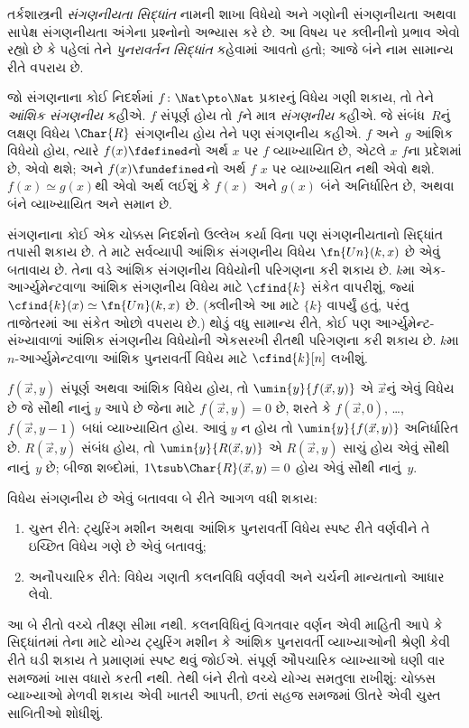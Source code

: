 તર્કશાસ્ત્રની \emph{સંગણનીયતા સિદ્ધાંત} નામની શાખા વિધેયો અને ગણોની
સંગણનીયતા અથવા સાપેક્ષ સંગણનીયતા અંગેના પ્રશ્નોનો અભ્યાસ કરે છે.
આ વિષય પર ક્લીનીનો પ્રભાવ એવો રહ્યો છે કે પહેલાં તેને \emph{પુનરાવર્તન
  સિદ્ધાંત} કહેવામાં આવતો હતો; આજે બંને નામ સામાન્ય રીતે વપરાય છે.

જો સંગણનાના કોઈ નિદર્શમાં $f\colon \Nat \pto \Nat$ પ્રકારનું વિધેય
ગણી શકાય, તો તેને \emph{આંશિક સંગણનીય} કહીએ. $f$ સંપૂર્ણ હોય તો
$f$ને માત્ર \emph{સંગણનીય} કહીએ. જે સંબંધ~$R$નું લક્ષણ વિધેય
$\Char{R}$ સંગણનીય હોય તેને પણ સંગણનીય કહીએ. $f$ અને~$g$ આંશિક
વિધેયો હોય, ત્યારે $f(x) \fdefined$નો અર્થ $x$ પર $f$ વ્યાખ્યાયિત
છે, એટલે $x$ $f$ના પ્રદેશમાં છે, એવો થશે; અને $f(x) \fundefined$નો
અર્થ $f$ $x$ પર વ્યાખ્યાયિત નથી એવો થશે. $f(x) \simeq g(x)$થી એવો અર્થ લઈશું કે
$f(x)$ અને $g(x)$ બંને અનિર્ધારિત છે, અથવા બંને વ્યાખ્યાયિત અને
સમાન છે.

સંગણનાના કોઈ એક ચોક્કસ નિદર્શનો ઉલ્લેખ કર્યા વિના પણ સંગણનીયતાનો
સિદ્ધાંત તપાસી શકાય છે. તે માટે સર્વવ્યાપી આંશિક સંગણનીય વિધેય
$\fn{Un}(k,x)$ છે એવું બતાવાય છે. તેના વડે આંશિક સંગણનીય વિધેયોની
પરિગણના કરી શકાય છે. $k$મા એક-આર્ગ્યુમેન્ટવાળા આંશિક સંગણનીય
વિધેય માટે $\cfind{k}$ સંકેત વાપરીશું, જ્યાં
$\cfind{k}(x) \simeq \fn{Un}(k,x)$ છે. (ક્લીનીએ આ માટે
$\{ k \}$ વાપર્યું હતું, પરંતુ તાજેતરમાં આ સંકેત ઓછો વપરાય છે.)
થોડું વધુ સામાન્ય રીતે, કોઈ પણ આર્ગ્યુમેન્ટ-સંખ્યાવાળાં આંશિક
સંગણનીય વિધેયોની એકસરખી રીતથી પરિગણના કરી શકાય છે. $k$મા
$n$-આર્ગ્યુમેન્ટવાળા આંશિક પુનરાવર્તી વિધેય માટે
$\cfind{k}[n]$ લખીશું.

$f(\vec x,y)$ સંપૂર્ણ અથવા આંશિક વિધેય હોય, તો
$\umin{y}{f(\vec x,y)}$ એ $\vec x$નું એવું વિધેય છે જે સૌથી નાનું
$y$ આપે છે જેના માટે $f(\vec x,y)=0$ છે, શરતે કે
$f(\vec x,0)$, \dots, $f(\vec x,y-1)$ બધાં વ્યાખ્યાયિત હોય.
આવું $y$ ન હોય તો $\umin{y}{f(\vec x,y)}$ અનિર્ધારિત છે.
$R(\vec x,y)$ સંબંધ હોય, તો $\umin{y}{R(\vec x,y)}$ એ
$R(\vec x,y)$ સાચું હોય એવું સૌથી નાનું~$y$ છે; બીજા શબ્દોમાં,
$1 \tsub \Char{R}(\vec x,y)=0$ હોય એવું સૌથી નાનું~$y$.

વિધેય સંગણનીય છે એવું બતાવવા બે રીતે આગળ વધી શકાય:
\begin{enumerate}
\item ચુસ્ત રીતે: ટ્યુરિંગ મશીન અથવા આંશિક પુનરાવર્તી વિધેય
  સ્પષ્ટ રીતે વર્ણવીને તે ઇચ્છિત વિધેય ગણે છે એવું બતાવવું;
\item અનૌપચારિક રીતે: વિધેય ગણતી કલનવિધિ વર્ણવવી અને ચર્ચની
  માન્યતાનો આધાર લેવો.
\end{enumerate}
આ બે રીતો વચ્ચે તીક્ષ્ણ સીમા નથી. કલનવિધિનું વિગતવાર વર્ણન એવી
માહિતી આપે કે સિદ્ધાંતમાં તેના માટે યોગ્ય ટ્યુરિંગ મશીન કે આંશિક
પુનરાવર્તી વ્યાખ્યાઓની શ્રેણી કેવી રીતે ઘડી શકાય તે પ્રમાણમાં સ્પષ્ટ
થવું જોઈએ. સંપૂર્ણ ઔપચારિક વ્યાખ્યાઓ ઘણી વાર સમજમાં ખાસ વધારો
કરતી નથી. તેથી બંને રીતો વચ્ચે યોગ્ય સમતુલા રાખીશું: ચોક્કસ
વ્યાખ્યાઓ મેળવી શકાય એવી ખાતરી આપતી, છતાં સહજ સમજમાં ઊતરે એવી
ચુસ્ત સાબિતીઓ શોધીશું.
\endgroup


